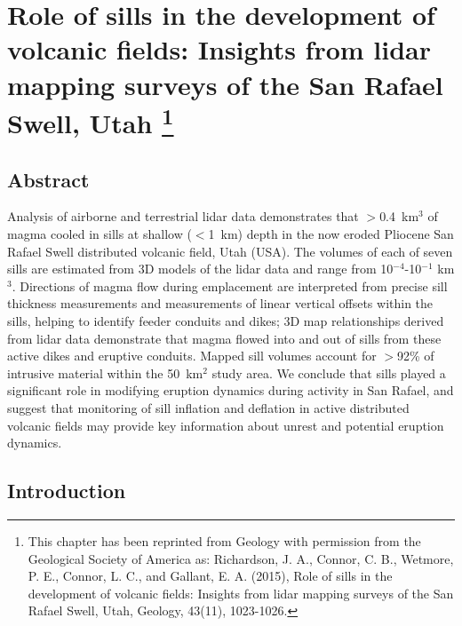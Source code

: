 \chapter[Role of sills in the development of volcanic fields: Insights from lidar mapping surveys of the San Rafael Swell, Utah]{Role of sills in the development of volcanic fields: Insights from lidar mapping surveys of the San Rafael Swell, Utah \footnote{This chapter has been reprinted from Geology with permission from the Geological Society of America as: Richardson, J. A., Connor, C. B., Wetmore, P. E., Connor, L. C., and Gallant, E. A. (2015), Role of sills in the development of volcanic fields: Insights from lidar mapping surveys of the San Rafael Swell, Utah, Geology, 43(11), 1023-1026.}}\label{ch_sills}


\renewcommand*{\FigPath}{figures/chapter-sills}

\section{Abstract}

Analysis of airborne and terrestrial lidar data demonstrates that $>$0.4~km$^3$ of magma cooled in sills at shallow ($<$1~km) depth in the now eroded Pliocene San Rafael Swell distributed volcanic field, Utah (USA). The volumes of each of seven sills are estimated from 3D models of the lidar data and range from 10$^{-4}$-10$^{-1}$ km$^3$. Directions of magma flow during emplacement are interpreted from precise sill thickness measurements and measurements of linear vertical offsets within the sills, helping to identify feeder conduits and dikes; 3D map relationships derived from lidar data demonstrate that magma flowed into and out of sills from these active dikes and eruptive conduits. Mapped sill volumes account for $>$92\% of intrusive material within the 50~km$^2$ study area. We conclude that sills played a significant role in modifying eruption dynamics during activity in San Rafael, and suggest that monitoring of sill inflation and deflation in active distributed volcanic fields may provide key information about unrest and potential eruption dynamics.


\section{Introduction}

